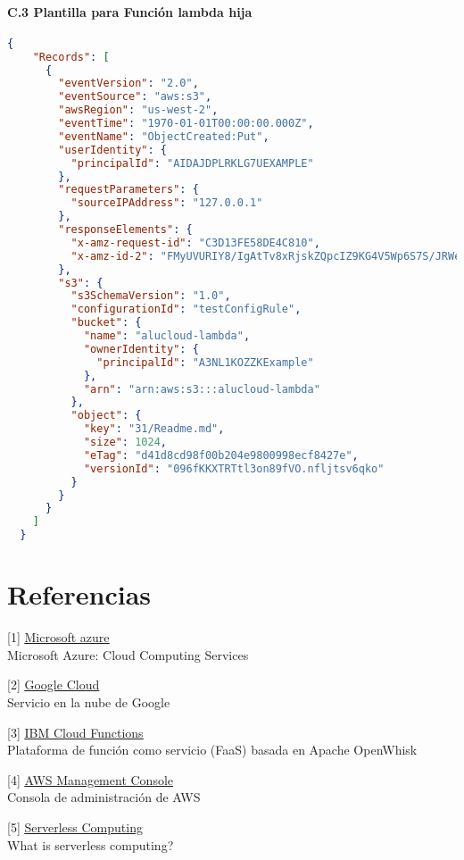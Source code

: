 \documentclass[
]{article}
\begin{document}
\hypertarget{header-n230}{%
\paragraph{C.3 Plantilla para Función lambda hija}\label{header-n230}}
\leavevmode
\newline
\begin{lstlisting}[language=json,firstnumber=1]
{
    "Records": [
      {
        "eventVersion": "2.0",
        "eventSource": "aws:s3",
        "awsRegion": "us-west-2",
        "eventTime": "1970-01-01T00:00:00.000Z",
        "eventName": "ObjectCreated:Put",
        "userIdentity": {
          "principalId": "AIDAJDPLRKLG7UEXAMPLE"
        },
        "requestParameters": {
          "sourceIPAddress": "127.0.0.1"
        },
        "responseElements": {
          "x-amz-request-id": "C3D13FE58DE4C810",
          "x-amz-id-2": "FMyUVURIY8/IgAtTv8xRjskZQpcIZ9KG4V5Wp6S7S/JRWeUWerMUE5JgHvANOjpD"
        },
        "s3": {
          "s3SchemaVersion": "1.0",
          "configurationId": "testConfigRule",
          "bucket": {
            "name": "alucloud-lambda",
            "ownerIdentity": {
              "principalId": "A3NL1KOZZKExample"
            },
            "arn": "arn:aws:s3:::alucloud-lambda"
          },
          "object": {
            "key": "31/Readme.md",
            "size": 1024,
            "eTag": "d41d8cd98f00b204e9800998ecf8427e",
            "versionId": "096fKKXTRTtl3on89fVO.nfljtsv6qko"
          }
        }
      }
    ]
  }
\end{lstlisting}

\hypertarget{header-n233}{%
\section{Referencias}\label{header-n233}}

{[}1{]}
\underline{\href{https://docs.microsoft.com/en-us/azure/?product=featured}{Microsoft
azure}}\\
Microsoft Azure: Cloud Computing Services

{[}2{]}
\underline{\href{https://cloud.google.com}{Google Cloud}}\\
Servicio en la nube de Google

{[}3{]}
\underline{\href{https://cloud.ibm.com/functions/}{IBM Cloud Functions}}\\
Plataforma de función como servicio (FaaS) basada en Apache OpenWhisk

{[}4{]}
\underline{\href{https://aws.amazon.com/es/console/}{AWS Management Console}}\\
Consola de administración de AWS

{[}5{]}
\underline{\href{https://www.ibm.com/cloud/learn/serverless}{Serverless
Computing}}\\
What is serverless computing?
\end{document}
